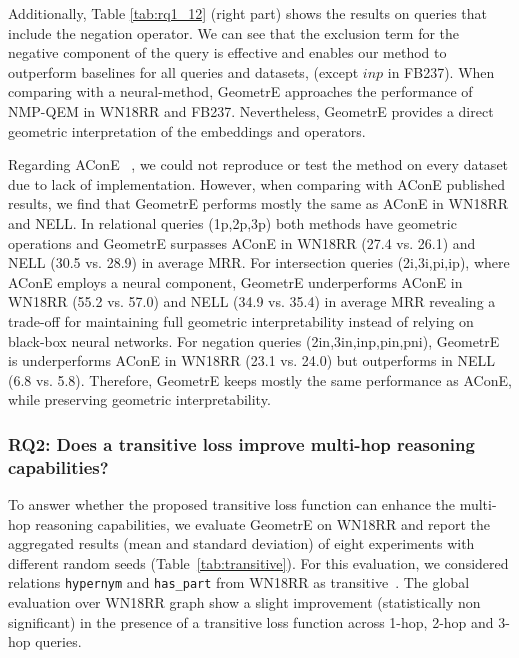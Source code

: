 \documentclass[runningheads]{llncs}
\newcommand{\method}{GeometrE}
\renewcommand{\paragraph}[1]{\subsubsection{#1}}
\begin{document}
Additionally, Table \ref{tab:rq1_12} (right part) shows the results on
queries that include the negation operator. We can see that the
exclusion term for the negative component of the query is effective
and enables our method to outperform baselines for all queries and
datasets, (except $inp$ in FB237). When comparing with a
neural-method, \method{} approaches the performance of NMP-QEM in
WN18RR and FB237. Nevertheless, \method{} provides a direct geometric
interpretation of the embeddings and operators.

Regarding AConE ~\cite{acone}, we could not reproduce or test the
method on every dataset due to lack of implementation.  However, when
comparing with AConE published results, we find that GeometrE performs
mostly the same as AConE in WN18RR and NELL. In relational queries (1p,2p,3p) both methods have
geometric operations and GeometrE surpasses AConE in WN18RR (27.4
vs. 26.1) and NELL (30.5 vs. 28.9) in average MRR. For intersection
queries (2i,3i,pi,ip), where AConE employs a neural component,
GeometrE underperforms AConE in WN18RR (55.2 vs. 57.0) and NELL (34.9
vs. 35.4) in average MRR revealing a trade-off for maintaining full
geometric interpretability instead of relying on black-box neural
networks. For negation queries (2in,3in,inp,pin,pni), GeometrE is
underperforms AConE in WN18RR (23.1 vs. 24.0) but outperforms in NELL
(6.8 vs. 5.8). Therefore, GeometrE keeps mostly the same performance
as AConE, while preserving geometric interpretability.


\paragraph{RQ2: Does a transitive loss improve multi-hop reasoning capabilities?}

To answer whether the proposed transitive loss function can enhance
the multi-hop reasoning capabilities, we evaluate \method{} on WN18RR
and report the aggregated results (mean and standard deviation) of
eight experiments with different random seeds
(Table~\ref{tab:transitive}). For this evaluation, we considered
relations \texttt{hypernym} and \texttt{has\_part} from WN18RR as
transitive~\cite{line}.
The global evaluation over WN18RR graph show a slight improvement
(statistically non significant) in the presence of a transitive loss
function across 1-hop, 2-hop and 3-hop queries.
\end{document}
